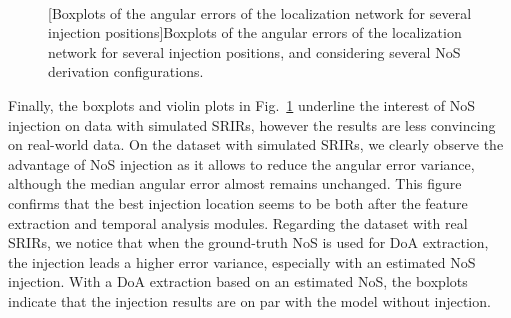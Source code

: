 \begin{figure}[ht!]
    \centering
        \\
    [Boxplots of the angular errors of the localization network for several injection positions]{Boxplots of the angular errors of the localization network for several injection positions, and considering several NoS derivation configurations.}
    \label{fig:hybrid_boxplots_nosInjection}
\end{figure}

Finally, the boxplots and violin plots in Fig.~\ref{fig:hybrid_boxplots_nosInjection} underline the interest of NoS injection on data with simulated SRIRs, however the results are less convincing on real-world data. On the dataset with simulated SRIRs, we clearly observe the advantage of NoS injection as it allows to reduce the angular error variance, although the median angular error almost remains unchanged. This figure confirms that the best injection location seems to be both after the feature extraction and temporal analysis modules. Regarding the dataset with real SRIRs, we notice that when the ground-truth NoS is used for DoA extraction, the injection leads a higher error variance, especially with an estimated NoS injection. With a DoA extraction based on an estimated NoS, the boxplots indicate that the injection results are on par with the model without injection.

